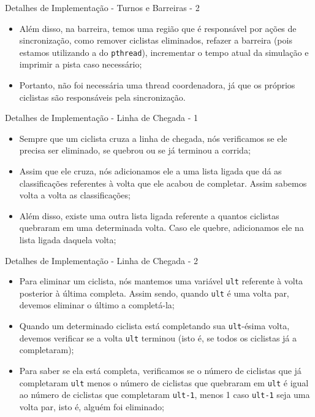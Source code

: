 \documentclass[10pt]{beamer}
\begin{document}
    \begin{frame}{Detalhes de Implementação - Turnos e Barreiras - 2}
      \begin{itemize}
        \justifying
      \item Além disso, na barreira, temos uma região que é responsável por
        ações de sincronização, como remover ciclistas eliminados, refazer a
        barreira (pois estamos utilizando a do \texttt{pthread}), incrementar o
        tempo atual da simulação e imprimir a pista caso necessário;
      \item Portanto, não foi necessária uma thread coordenadora, já que os
        próprios ciclistas são responsáveis pela sincronização.
      \end{itemize}
    \end{frame}

    \begin{frame}{Detalhes de Implementação - Linha de Chegada - 1}
      \begin{itemize}
        \justifying
      \item Sempre que um ciclista cruza a linha de chegada, nós verificamos se
        ele precisa ser eliminado, se quebrou ou se já terminou a corrida;
      \item Assim que ele cruza, nós adicionamos ele a uma lista ligada que dá
        as classificações referentes à volta que ele acabou de completar. Assim
        sabemos volta a volta as classificações;
      \item Além disso, existe uma outra lista ligada referente a quantos
        ciclistas quebraram em uma determinada volta. Caso ele quebre,
        adicionamos ele na lista ligada daquela volta;
      \end{itemize}
    \end{frame}

    \begin{frame}{Detalhes de Implementação - Linha de Chegada - 2}
      \begin{itemize}
        \justifying
      \item Para eliminar um ciclista, nós mantemos uma variável \texttt{ult}
        referente à volta posterior à última completa. Assim sendo, quando
        \texttt{ult} é uma volta par, devemos eliminar o último a completá-la;

      \item Quando um determinado ciclista está completando sua
        \texttt{ult}-ésima volta, devemos verificar se a volta \texttt{ult}
        terminou (isto é, se todos os ciclistas já a completaram);

      \item Para saber se ela está completa, verificamos se o número de
        ciclistas que já completaram \texttt{ult} menos o número de ciclistas
        que quebraram em \texttt{ult} é igual ao número de ciclistas que
        completaram \texttt{ult-1}, menos 1 caso \texttt{ult-1} seja uma volta
        par, isto é, alguém foi eliminado;
      \end{itemize}
    \end{frame}
\end{document}
